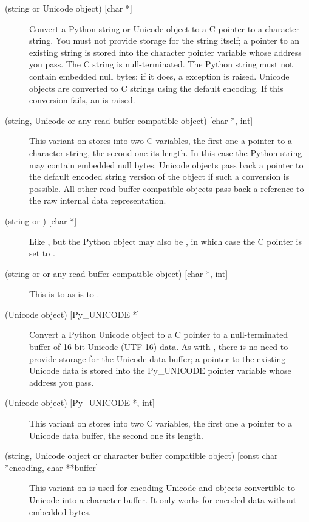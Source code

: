 \documentclass{manual}
\begin{document}
\begin{description}

\item[ (string or Unicode object) {[char *]}]
Convert a Python string or Unicode object to a C pointer to a
character string.  You must not provide storage for the string
itself; a pointer to an existing string is stored into the character
pointer variable whose address you pass.  The C string is
null-terminated.  The Python string must not contain embedded null
bytes; if it does, a  exception is raised.
Unicode objects are converted to C strings using the default
encoding. If this conversion fails, an  is
raised.

\item[ (string, Unicode or any read buffer compatible object) 
{[char *, int]}]
This variant on  stores into two C variables, the first one a
pointer to a character string, the second one its length.  In this
case the Python string may contain embedded null bytes.  Unicode
objects pass back a pointer to the default encoded string version of the
object if such a conversion is possible. All other read buffer
compatible objects pass back a reference to the raw internal data
representation.

\item[ (string or ) {[char *]}]
Like , but the Python object may also be , in which
case the C pointer is set to \NULL{}.

\item[ (string or  or any read buffer compatible object) 
{[char *, int]}]
This is to  as  is to .

\item[ (Unicode object) {[Py_UNICODE *]}]
Convert a Python Unicode object to a C pointer to a null-terminated
buffer of 16-bit Unicode (UTF-16) data.  As with , there is no need
to provide storage for the Unicode data buffer; a pointer to the
existing Unicode data is stored into the Py_UNICODE pointer variable whose
address you pass.  

\item[ (Unicode object) {[Py_UNICODE *, int]}]
This variant on  stores into two C variables, the first one
a pointer to a Unicode data buffer, the second one its length.

\item[ (string, Unicode object or character buffer compatible
object) {[const char *encoding, char **buffer]}]
This variant on  is used for encoding Unicode and objects
convertible to Unicode into a character buffer. It only works for
encoded data without embedded \NULL{} bytes.


\end{description}
\end{document}
